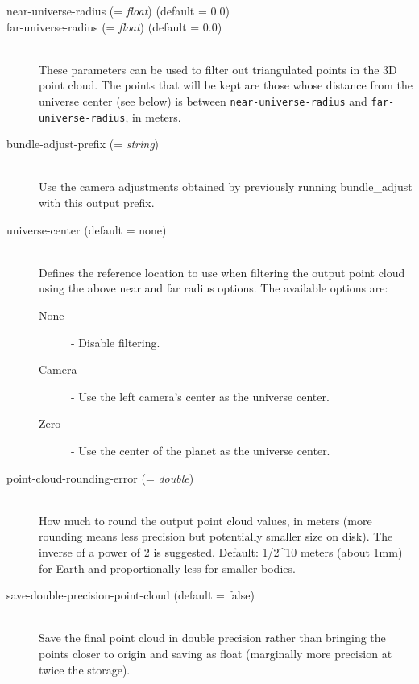 \begin{description}
\item[near-universe-radius \textnormal{\small{(= \emph{float})}} (default = 0.0)]
\item[far-universe-radius \textnormal{\small{(= \emph{float})}} (default = 0.0)] \hfill \\

These parameters can be used to filter out triangulated points in
the 3D point cloud. The points that will be kept are those
whose distance from the universe center (see below) is between
\texttt{near-universe-radius} and \texttt{far-universe-radius}, in meters.

\item[bundle-adjust-prefix \textnormal{\small{(= \emph{string})}}] \hfill \\ Use the camera adjustments obtained by previously running bundle\_adjust with this output prefix.

\item[universe-center \textnormal (default = none)] \hfill \\
Defines the reference location to use when filtering the output point cloud
using the above near and far radius options. The available options
are:

  \begin{description}
    \item[None] - Disable filtering.
    \item[Camera] - Use the left camera's center as the universe center.
    \item[Zero]   - Use the center of the planet as the universe center.
  \end{description}

\item[point-cloud-rounding-error \textnormal{\small{(= \emph{double})}}] \hfill \\

How much to round the output point cloud values, in meters (more
rounding means less precision but potentially smaller size on disk). The
inverse of a power of 2 is suggested. Default: 1/2^10 meters (about 1mm) for Earth and
proportionally less for smaller bodies.

\item[save-double-precision-point-cloud \textnormal (default = false)] \hfill \\

Save the final point cloud in double precision rather than bringing the
points closer to origin and saving as float (marginally more precision
at twice the storage).


\end{description}
